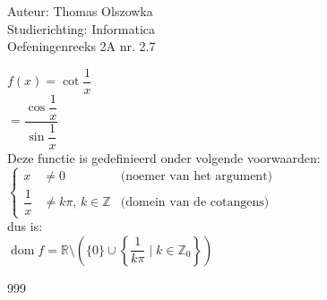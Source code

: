 \documentclass[a4paper]{article}
\begin{document}
\noindent \large Auteur: Thomas Olszowka \\
\noindent \large Studierichting: Informatica\\
\noindent \large Oefeningenreeks 2A nr. 2.7\\

\medskip

\normalsize

$f(x) = \cot \dfrac{1}{x}$ \\

$ =\dfrac{\cos \dfrac{1}{x}}{\sin \dfrac{1}{x}}$ \\

Deze functie is gedefinieerd onder volgende voorwaarden: \\

$\left\{  
\begin{array}{llr}
x & \neq 0 & \text{(noemer van het argument)} \\

\dfrac{1}{x} &\neq k\pi \text{, }  k \in \mathbb{Z} & \text{(domein van de cotangens)}
\end{array}
\right .$ \\

dus is: \\

$\operatorname{dom}f = \mathbb{R} \setminus \left( \{ 0\} \cup \left\{  \dfrac{1}{k\pi}  \mid k \in \mathbb{Z}_{0}  \right\} \right)$ \\


\begin{thebibliography}{999}
\end{thebibliography}
\end{document}
